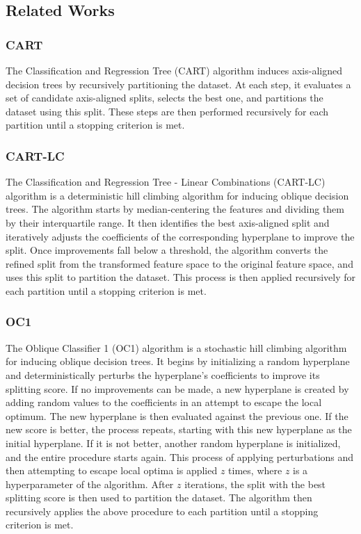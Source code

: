 \documentclass[10pt]{article} %
\begin{document}
\subsection{Related Works}\label{related_works}

  \subsubsection{CART}

The Classification and Regression Tree (CART) algorithm \citep{breiman1984cart} induces axis-aligned decision trees by recursively partitioning the dataset. At each step, it evaluates a set of candidate axis-aligned splits, selects the best one, and partitions the dataset using this split. These steps are then performed recursively for each partition until a stopping criterion is met.

  \subsubsection{CART-LC}

The Classification and Regression Tree - Linear Combinations (CART-LC) algorithm \citep{breiman1984cart} is a deterministic hill climbing algorithm for inducing oblique decision trees. The algorithm starts by median-centering the features and dividing them by their interquartile range. It then identifies the best axis-aligned split and iteratively adjusts the coefficients of the corresponding hyperplane to improve the split. Once improvements fall below a threshold, the algorithm converts the refined split from the transformed feature space to the original feature space, and uses this split to partition the dataset. This process is then applied recursively for each partition until a stopping criterion is met.

  \subsubsection{OC1}

The Oblique Classifier 1 (OC1) algorithm \citep{MurthyKS94} is a stochastic hill climbing algorithm for inducing oblique decision trees. It begins by initializing a random hyperplane and deterministically perturbs the hyperplane's coefficients to improve its splitting score. If no improvements can be made, a new hyperplane is created by adding random values to the coefficients in an attempt to escape the local optimum. The new hyperplane is then evaluated against the previous one. If the new score is better, the process repeats, starting with this new hyperplane as the initial hyperplane. If it is not better, another random hyperplane is initialized, and the entire procedure starts again. This process of applying perturbations and then attempting to escape local optima is applied $z$ times, where $z$ is a hyperparameter of the algorithm. After $z$ iterations, the split with the best splitting score is then used to partition the dataset. The algorithm then recursively applies the above procedure to each partition until a stopping criterion is met.
\end{document}
